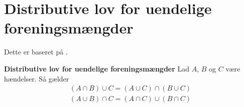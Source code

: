 \section{Distributive lov for uendelige foreningsmængder}\label{Distributive love}
Dette er baseret på \cite[s. 6]{olofsson2005probability}.

\begin{minipage}\textwidth
\begin{lem} \textbf{Distributive lov for uendelige foreningsmængder} %
\newline
Lad $A$, $B$ og $C$ være hændelser. Så gælder
    \begin{align*}
        (A\cap B)\cup C=(A\cup C)\cap(B\cup C)\\
        (A\cup B)\cap C=(A\cap C)\cup(B\cap C)
    \end{align*}
\end{lem}
\end{minipage}
